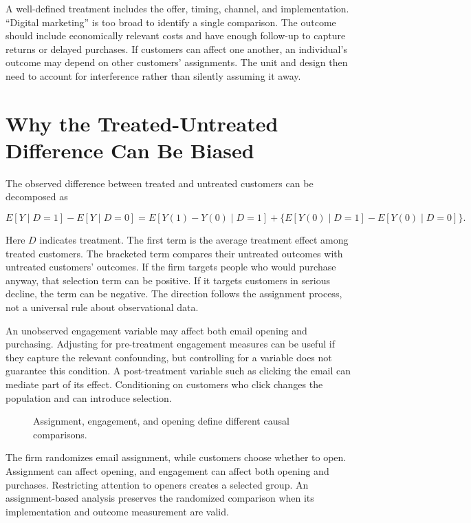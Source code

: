 A well-defined treatment includes the offer, timing, channel, and
implementation. ``Digital marketing'' is too broad to identify a single
comparison. The outcome should include economically relevant costs and
have enough follow-up to capture returns or delayed purchases. If
customers can affect one another, an individual's outcome may depend on
other customers' assignments. The unit and design then need to account
for interference rather than silently assuming it away.

\hypertarget{M06-why-the-treated-untreated-difference-can-be-biased}{%
\section{Why the Treated-Untreated Difference Can Be
Biased}\label{M06-why-the-treated-untreated-difference-can-be-biased}}

\noindent The observed difference between treated and untreated customers can be
decomposed as

\[
E[Y\mid D=1]-E[Y\mid D=0]
=E[Y(1)-Y(0)\mid D=1]
+\{E[Y(0)\mid D=1]-E[Y(0)\mid D=0]\}.
\]

Here \(D\) indicates treatment. The first term is the average treatment
effect among treated customers. The bracketed term compares their
untreated outcomes with untreated customers' outcomes. If the firm
targets people who would purchase anyway, that selection term can be
positive. If it targets customers in serious decline, the term can be
negative. The direction follows the assignment process, not a universal
rule about observational data.

An unobserved engagement variable may affect both email opening and
purchasing. Adjusting for pre-treatment engagement measures can be
useful if they capture the relevant confounding, but controlling for a
variable does not guarantee this condition. A post-treatment variable
such as clicking the email can mediate part of its effect. Conditioning
on customers who click changes the population and can introduce
selection.

\begin{figure}[htbp]
\centering

\caption{Assignment, engagement, and opening define different causal comparisons.}\label{fig:M06_dag}
\end{figure}

The firm randomizes email assignment, while customers choose whether to
open. Assignment can affect opening, and engagement can affect both
opening and purchases. Restricting attention to openers creates a
selected group. An assignment-based analysis preserves the randomized
comparison when its implementation and outcome measurement are valid.

